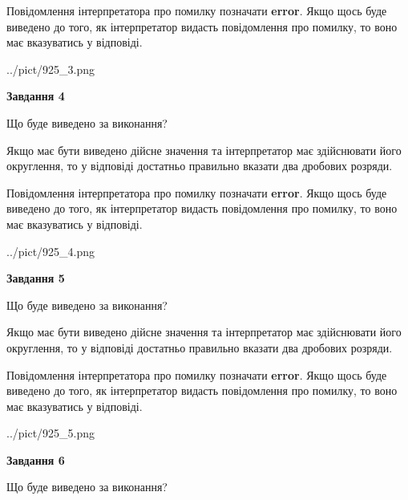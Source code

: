 \documentclass[12pt, ukrainian]{article}
\begin{document}
{\begin {Large}
Повідомлення інтерпретатора про помилку позначати \textbf{error}.
Якщо щось буде виведено до того, як інтерпретатор видасть повідомлення про помилку, 
то воно має вказуватись у відповіді. \par

\begin{center}
	{../pict/925_3.png}
\end{center}
\newpage

{\begin {center}\textbf{Завдання 4}\end {center}}\par
Що буде виведено за виконання? \par

Якщо має бути виведено дійсне значення та інтерпретатор має здійснювати його округлення, 
то у відповіді достатньо правильно вказати два дробових розряди.

Повідомлення інтерпретатора про помилку позначати \textbf{error}.
Якщо щось буде виведено до того, як інтерпретатор видасть повідомлення про помилку, 
то воно має вказуватись у відповіді. \par

\begin{center}
	{../pict/925_4.png}
\end{center}
\newpage

{\begin {center}\textbf{Завдання 5}\end {center}}\par
Що буде виведено за виконання? \par

Якщо має бути виведено дійсне значення та інтерпретатор має здійснювати його округлення, 
то у відповіді достатньо правильно вказати два дробових розряди.

Повідомлення інтерпретатора про помилку позначати \textbf{error}.
Якщо щось буде виведено до того, як інтерпретатор видасть повідомлення про помилку, 
то воно має вказуватись у відповіді. \par

\begin{center}
	{../pict/925_5.png}
\end{center}
\newpage

{\begin {center}\textbf{Завдання 6}\end {center}}\par
Що буде виведено за виконання? \par


\end{Large}}
\end{document}

